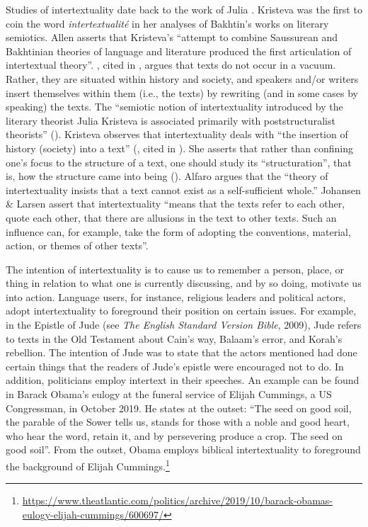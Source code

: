 \documentclass[output=paper,colorlinks,citecolor=brown]{langscibook}
\begin{document}
Studies of intertextuality date back to the work of Julia \citet{Kristeva1980}. Kristeva was the first to coin the word \textit{intertextualité} in her analyses of Bakhtin’s works on literary semiotics. Allen \citeyearpar[3]{Allen2011} asserts that Kristeva’s “attempt to combine Saussurean and Bakhtinian theories of language and literature produced the first articulation of intertextual theory”. \citet{Bakhtin1981}, cited in \citet{Obeng2016}, argues that texts do not occur in a vacuum. Rather, they are situated within history and society, and speakers and/or writers insert themselves within them (i.e., the texts) by rewriting (and in some cases by speaking) the texts. The “semiotic notion of intertextuality introduced by the literary theorist Julia Kristeva is associated primarily with poststructuralist theorists” (\cite[197]{Chandler2007}). Kristeva observes that intertextuality deals with “the insertion of history (society) into a text” (\cite[39]{Kristeva1980}, cited in \cite[195]{Fairclough1992a}). She asserts that rather than confining one’s focus to the structure of a text, one should study its ``structuration'', that is, how the structure came into being (\cite[197]{Chandler2007}). Alfaro \citeyearpar[268]{Alfaro1996} argues that the “theory of intertextuality insists that a text cannot exist as a self-sufficient whole.” Johansen \& Larsen \citeyearpar[126]{JohansenLarsen2002} assert that intertextuality “means that the texts refer to each other, quote each other, that there are allusions in the text to other texts. Such an influence can, for example, take the form of adopting the conventions, material, action, or themes of other texts”. 

The intention of intertextuality is to cause us to remember a person, place, or thing in relation to what one is currently discussing, and by so doing, motivate us into action. Language users, for instance, religious leaders and political actors, adopt intertextuality to foreground  their position on certain issues. For example, in the Epistle of Jude (see \textit{The English Standard Version Bible}, 2009), Jude refers to texts in the Old Testament about Cain's way, Balaam’s error, and Korah’s rebellion. The intention of Jude was to state that the actors mentioned had done certain things that the readers of Jude’s epistle were encouraged not to do. In addition, politicians employ intertext in their speeches. An example can be found in Barack Obama’s eulogy at the funeral service of Elijah Cummings, a US Congressman, in October 2019. He states at the outset: “The seed on good soil, the parable of the Sower tells us, stands for those with a noble and good heart, who hear the word, retain it, and by persevering produce a crop. The seed on good soil''. From the outset, Obama employs biblical intertextuality to foreground the background of Elijah Cummings.\footnote{\url{https://www.theatlantic.com/politics/archive/2019/10/barack-obamas-eulogy-elijah-cummings/600697/}}
\end{document}
